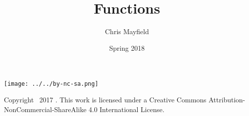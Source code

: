 \documentclass[12pt]{article}
\title{Functions}
\author{Chris Mayfield}
\date{Spring 2018}
\begin{document}
\maketitle


\newpage


\begin{minipage}{0.133\linewidth}
\texttt{[image: ../../by-nc-sa.png]}
\end{minipage}
\hfill
\begin{minipage}{0.853\linewidth}
\small
Copyright \textcopyright\ 2017 \theauthor.
This work is licensed under a Creative Commons Attribution-NonCommercial-ShareAlike 4.0 International License.
\end{minipage}
\clearpage
\end{document}
